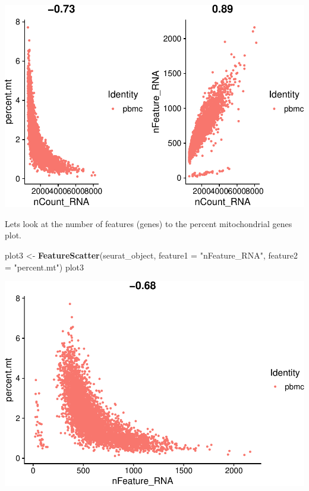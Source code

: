 \documentclass[
]{book}
\newenvironment{Shaded}{\begin{snugshade}}{\end{snugshade}}
\newcommand{\AttributeTok}[1]{\textcolor[rgb]{0.13,0.29,0.53}{#1}}
\newcommand{\FunctionTok}[1]{\textcolor[rgb]{0.13,0.29,0.53}{\textbf{#1}}}
\newcommand{\NormalTok}[1]{#1}
\newcommand{\OtherTok}[1]{\textcolor[rgb]{0.56,0.35,0.01}{#1}}
\newcommand{\StringTok}[1]{\textcolor[rgb]{0.31,0.60,0.02}{#1}}
\begin{document}
\includegraphics{scRNAseqInR_ABACBS_2024_Doco_files/figure-latex/qc2-4.pdf}

Lets look at the number of features (genes) to the percent mitochondrial genes plot.

\begin{Shaded}
\begin{Highlighting}[]
\NormalTok{plot3 }\OtherTok{\textless{}{-}} \FunctionTok{FeatureScatter}\NormalTok{(seurat\_object, }\AttributeTok{feature1 =} \StringTok{"nFeature\_RNA"}\NormalTok{, }\AttributeTok{feature2 =} \StringTok{"percent.mt"}\NormalTok{) }
\NormalTok{plot3}
\end{Highlighting}
\end{Shaded}

\includegraphics{scRNAseqInR_ABACBS_2024_Doco_files/figure-latex/unnamed-chunk-12-1.pdf}
\end{document}
